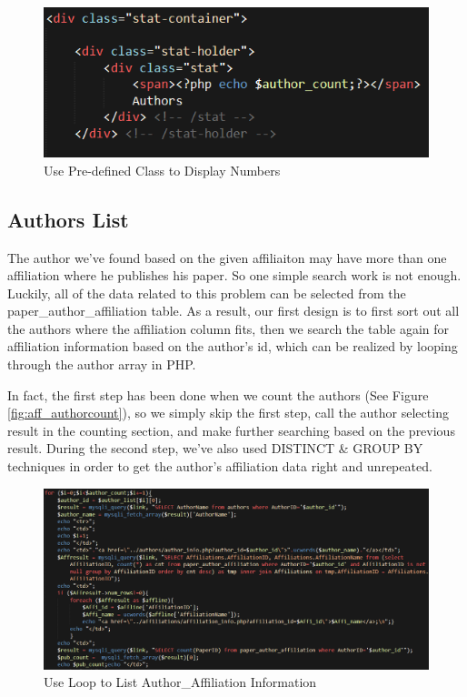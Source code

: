 \documentclass{book}
\begin{document}
\begin{figure}[H]
\centering
\includegraphics[scale=0.8]{img/zlt_aff_countdisplay.png}
\caption{Use Pre-defined Class to Display Numbers}
\end{figure}


\subsection{Authors List}

The author we've found based on the given affiliaiton may have more than one affiliation where he publishes his paper. So one simple search work is not enough. Luckily, all of the data related to this problem can be selected from the paper\_author\_affiliation table. As a result, our first design is to first sort out all the authors where the affiliation column fits, then we search the table again for affiliation information based on the author's id, which can be realized by looping through the author array in PHP.

In fact, the first step has been done when we count the authors (See Figure \ref{fig:aff_authorcount}), so we simply skip the first step, call the author selecting result in the counting section, and make further searching based on the previous result. During the second step, we've also used DISTINCT \& GROUP BY techniques in order to get the author's affiliation data right and unrepeated.

\begin{figure}[H]
\centering
\includegraphics[scale=0.55]{img/zlt_aff_authorloop.png}
\caption{Use Loop to List Author\_Affiliation Information}
\end{figure}
\end{document}
